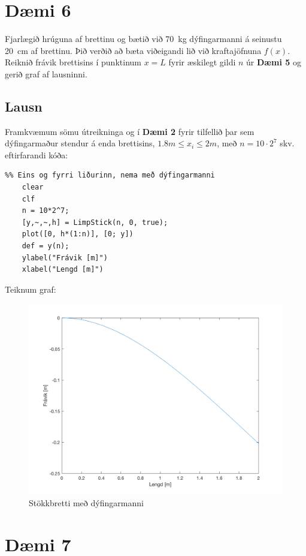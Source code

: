 \documentclass[11pt]{article}
\begin{document}
{\section*{Dæmi 6}

Fjarlægið hrúguna af brettinu og bætið við \SI{70}{\kilo\gram} dýfingarmanni á seinustu \SI{20}{\centi\meter} af brettinu. Þið verðið að bæta viðeigandi lið við kraftajöfnuna $f(x)$. Reiknið frávik brettisins í punktinum $x = L$ fyrir æskilegt gildi $n$ úr \textbf{Dæmi 5} og gerið graf af lausninni.

\subsection*{Lausn}

Framkvæmum sömu útreikninga og í \textbf{Dæmi 2} fyrir tilfellið þar sem dýfingarmaður stendur á enda brettisins, $1.8m\leq x_i \leq 2m$, með $n=10 \cdot 2^7$ skv. eftirfarandi kóða:
\begin{verbatim}
%% Eins og fyrri liðurinn, nema með dýfingarmanni
    clear
    clf
    n = 10*2^7;
    [y,~,~,h] = LimpStick(n, 0, true);
    plot([0, h*(1:n)], [0; y])
    def = y(n);
    ylabel("Frávik [m]")
    xlabel("Lengd [m]")
\end{verbatim}
Teiknum graf:\\
\begin{figure}[h!]
\centering
\includegraphics[scale=0.32]{bretti_m_dyfingarmanni.png}
\caption{Stökkbretti með dýfingarmanni}
\end{figure}

\newpage
\section*{Dæmi 7}

}
\end{document}
